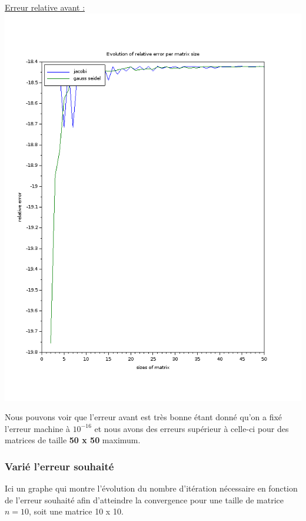 \documentclass[11pt]{article}
\begin{document}
\vspace{5mm}
\underline{Erreur relative avant :}\newline
\includegraphics[scale=0.5]{img/number_of_iteration_relres.png}

Nous pouvons voir que l'erreur avant est très bonne étant donné
qu'on a fixé l'erreur machine à $10^{-16}$ et nous avons des erreurs
supérieur à celle-ci pour des matrices de taille \textbf{50 x 50}
maximum.

\subsubsection{Varié l'erreur souhaité}

Ici un graphe qui montre l'évolution du nombre d'itération nécessaire
en fonction de l'erreur souhaité afin d'atteindre la convergence pour
une taille de matrice $n = 10$, soit une matrice 10 x 10.
\end{document}

